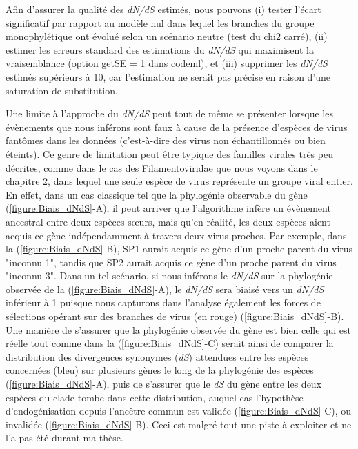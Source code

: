 Afin d'assurer la qualité des \textit{dN/dS} estimés, nous pouvons (i) tester l'écart significatif par rapport au modèle nul dans lequel les branches du groupe monophylétique ont évolué selon un scénario neutre (test du chi2 carré), (ii) estimer les erreurs standard des estimations du \textit{dN/dS} qui maximisent la vraisemblance (option getSE = 1 dans codeml), et (iii) supprimer les \textit{dN/dS} estimés supérieurs à 10, car l'estimation ne serait pas précise en raison d'une saturation de substitution.

Une limite à l'approche du \textit{dN/dS} peut tout de même se présenter lorsque les évènements que nous inférons sont faux à cause de la présence d'espèces de virus fantômes dans les données (c'est-à-dire des virus non échantillonnés ou bien éteints). Ce genre de limitation peut être typique des familles virales très peu décrites, comme dans le cas des Filamentoviridae que nous voyons dans le \hyperref[sec:chap2]{chapitre 2}, dans lequel une seule espèce de virus représente un groupe viral entier. En effet, dans un cas classique tel que la phylogénie observable du gène (\figurename{\ref{figure:Biais_dNdS}}-A), il peut arriver que l'algorithme infère un évènement ancestral entre deux espèces sœurs, mais qu'en réalité, les deux espèces aient acquis ce gène indépendamment à travers deux virus proches. Par exemple, dans la (\figurename{\ref{figure:Biais_dNdS}}-B), SP1 aurait acquis ce gène d'un proche parent du virus "inconnu 1", tandis que SP2 aurait acquis ce gène d'un proche parent du virus "inconnu 3". Dans un tel scénario, si nous inférons le \textit{dN/dS} sur la phylogénie observée de la (\figurename{\ref{figure:Biais_dNdS}}-A), le \textit{dN/dS} sera biaisé vers un \textit{dN/dS} inférieur à 1 puisque nous capturons dans l'analyse également les forces de sélections opérant sur des branches de virus (en rouge) (\figurename{\ref{figure:Biais_dNdS}}-B). Une manière de s'assurer que la phylogénie observée du gène est bien celle qui est réelle tout comme dans la (\figurename{\ref{figure:Biais_dNdS}}-C) serait ainsi de comparer la distribution des divergences synonymes (\textit{dS}) attendues entre les espèces concernées (bleu) sur plusieurs gènes le long de la phylogénie des espèces (\figurename{\ref{figure:Biais_dNdS}}-A), puis de s'assurer que le \textit{dS} du gène entre les deux espèces du clade tombe dans cette distribution, auquel cas l'hypothèse d'endogénisation depuis l'ancêtre commun est validée (\figurename{\ref{figure:Biais_dNdS}}-C), ou invalidée (\figurename{\ref{figure:Biais_dNdS}}-B). Ceci est malgré tout une piste à exploiter et ne l'a pas été durant ma thèse. 

